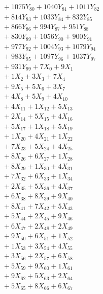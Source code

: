 \documentclass[a4paper,10pt]{article}
\begin{document}
{\begin{align}
&\;  + 1075 Y_{80} + 1040 Y_{81} + 1011 Y_{82} \\[0.3ex]
&\;  + 814 Y_{83} + 1033 Y_{84} + 832 Y_{85} \\[0.3ex]
&\;  + 866 Y_{86} + 994 Y_{87} + 951 Y_{88} \\[0.5ex]\allowbreak
&\;  + 830 Y_{89} + 1056 Y_{90} + 900 Y_{91} \\[0.3ex]
&\;  + 977 Y_{92} + 1004 Y_{93} + 1079 Y_{94} \\[0.3ex]
&\;  + 983 Y_{95} + 1097 Y_{96} + 1037 Y_{97} \\[0.3ex]
&\;  + 931 Y_{99} + 7 X_{0} + 9 X_{1} \\[0.3ex]
&\;  + 1 X_{2} + 3 X_{3} + 7 X_{4} \\[0.3ex]
&\;  + 9 X_{5} + 5 X_{6} + 3 X_{7} \\[0.3ex]
&\;  + 4 X_{8} + 5 X_{9} + 4 X_{10} \\[0.3ex]
&\;  + 4 X_{11} + 1 X_{12} + 5 X_{13} \\[0.3ex]
&\;  + 2 X_{14} + 5 X_{15} + 4 X_{16} \\[0.3ex]
&\;  + 5 X_{17} + 1 X_{18} + 5 X_{19} \\[0.5ex]\allowbreak
&\;  + 1 X_{20} + 4 X_{21} + 1 X_{22} \\[0.3ex]
&\;  + 7 X_{23} + 5 X_{24} + 4 X_{25} \\[0.3ex]
&\;  + 8 X_{26} + 6 X_{27} + 1 X_{28} \\[0.3ex]
&\;  + 8 X_{29} + 1 X_{30} + 4 X_{31} \\[0.3ex]
&\;  + 7 X_{32} + 6 X_{33} + 1 X_{34} \\[0.3ex]
&\;  + 2 X_{35} + 5 X_{36} + 4 X_{37} \\[0.3ex]
&\;  + 6 X_{38} + 8 X_{39} + 9 X_{40} \\[0.3ex]
&\;  + 8 X_{41} + 7 X_{42} + 5 X_{43} \\[0.3ex]
&\;  + 5 X_{44} + 2 X_{45} + 9 X_{46} \\[0.3ex]
&\;  + 6 X_{47} + 2 X_{48} + 2 X_{49} \\[0.5ex]\allowbreak
&\;  + 9 X_{50} + 6 X_{51} + 1 X_{52} \\[0.3ex]
&\;  + 1 X_{53} + 3 X_{54} + 4 X_{55} \\[0.3ex]
&\;  + 3 X_{56} + 2 X_{57} + 6 X_{58} \\[0.3ex]
&\;  + 5 X_{59} + 9 X_{60} + 1 X_{61} \\[0.3ex]
&\;  + 9 X_{62} + 5 X_{63} + 2 X_{64} \\[0.3ex]
&\;  + 5 X_{65} + 8 X_{66} + 6 X_{67} \\[0.3ex]

\end{align}}
\end{document}
